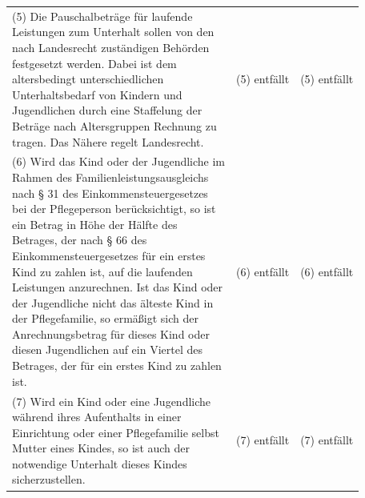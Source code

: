 \documentclass[10pt,a4paper,landscape]{article}
\begin{document}
\begin{longtable}{|L{8.2cm}|L{8.2cm}|L{8.2cm}|}
\hhline{|---|}
(5) \textcolor{diffred}{Die Pauschalbeträge für laufende  \newline Leistungen zum Unterhalt sollen von den  \newline nach Landesrecht zuständigen Behörden  \newline festgesetzt werden. Dabei ist dem  \newline altersbedingt unterschiedlichen  \newline Unterhaltsbedarf von Kindern und  \newline Jugendlichen durch eine Staffelung der  \newline Beträge nach Altersgruppen Rechnung zu  \newline tragen. Das Nähere regelt Landesrecht.} & (5) entfällt & (5) entfällt \\
\hhline{|---|}
(6) \textcolor{diffred}{Wird das Kind oder der Jugendliche im  \newline Rahmen des Familienleistungsausgleichs  \newline nach \S{} 31 des Einkommensteuergesetzes  \newline bei der Pflegeperson berücksichtigt, so ist  \newline ein Betrag in Höhe der Hälfte des  \newline Betrages, der nach \S{} 66 des  \newline Einkommensteuergesetzes für ein erstes  \newline Kind zu zahlen ist, auf die laufenden  \newline Leistungen anzurechnen. Ist das Kind oder  \newline der Jugendliche nicht das älteste Kind in  \newline der Pflegefamilie, so ermäßigt sich der  \newline Anrechnungsbetrag für dieses Kind oder  \newline diesen Jugendlichen auf ein Viertel des  \newline Betrages, der für ein erstes Kind zu zahlen  \newline ist.} & (6) entfällt & (6) entfällt \\
\hhline{|---|}
(7) \textcolor{diffred}{Wird ein Kind oder eine Jugendliche  \newline während ihres Aufenthalts in einer  \newline Einrichtung oder einer Pflegefamilie selbst  \newline Mutter eines Kindes, so ist auch der  \newline notwendige Unterhalt dieses Kindes  \newline sicherzustellen.} & (7) entfällt & (7) entfällt \\

\end{longtable}
\end{document}

